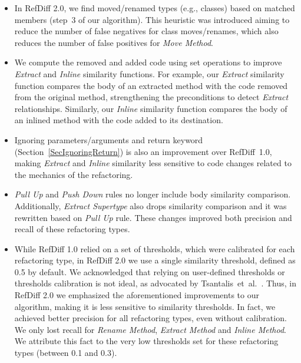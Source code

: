 \begin{itemize}
\item In RefDiff 2.0, we find moved/renamed types (e.g., classes) based on matched members (step~3 of our algorithm). This heuristic was introduced aiming to reduce the number of false negatives for class moves/renames, which also reduces the number of false positives for \emph{Move Method}.

\item We compute the removed and added code using set operations to improve \emph{Extract} and \emph{Inline} similarity functions. For example, our \emph{Extract} similarity function compares the body of an extracted method with the code removed from the original method, strengthening the preconditions to detect \emph{Extract} relationships. Similarly, our \emph{Inline} similarity function compares the body of an inlined method with the code added to its destination.

\item Ignoring parameters/arguments and return keyword (Section~\ref{SecIgnoringReturn}) is also an improvement over RefDiff~1.0, making \emph{Extract} and \emph{Inline} similarity less sensitive to code changes related to the mechanics of the refactoring.

\item \emph{Pull Up} and \emph{Push Down} rules no longer include body similarity comparison. Additionally, \emph{Extract Supertype} also drops similarity comparison and it was rewritten based on \emph{Pull Up} rule. These changes improved both precision and recall of these refactoring types.

\item While RefDiff 1.0 relied on a set of thresholds, which were calibrated for each refactoring type, in RefDiff 2.0 we use a single similarity threshold, defined as 0.5 by default.
We acknowledged that relying on user-defined thresholds or thresholds calibration is not ideal, as advocated by Tsantalis~et~al.~\cite{tsantalis2018rminer}.
Thus, in RefDiff 2.0 we emphasized the aforementioned improvements to our algorithm, making it is less sensitive to similarity thresholds.
In fact, we achieved better precision for all refactoring types, even without calibration.
We only lost recall for \emph{Rename Method}, \emph{Extract Method} and \emph{Inline Method}.
We attribute this fact to the very low thresholds set for these refactoring types (between 0.1 and 0.3).

\end{itemize}

